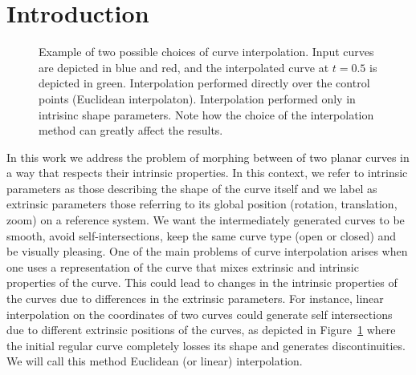 \documentclass{ipol}
\newcommand{\chapFiveDir}{images/chapter_05a}
\begin{document}
\section{Introduction}
%
\begin{figure}[h]
	\centering
	\caption{Example of two possible choices of curve interpolation. Input curves are depicted in blue and red, and the interpolated curve at $t=0.5$ is depicted in green. \protect{} Interpolation performed directly over the control points (Euclidean interpolaton). \protect{} Interpolation performed only in intrisinc shape parameters. Note how the choice of the interpolation method can greatly affect the results.}
	\label{fig:image_interpolation:curve_interpolation:example}
\end{figure}
%
In this work we address the problem of morphing between of two planar curves in a way that respects their intrinsic properties. In this context, we refer to intrinsic parameters as those describing the shape of the curve itself and we label as extrinsic parameters those referring to its global position (rotation, translation, zoom) on a reference system. We want the intermediately generated curves to be smooth, avoid self-intersections, keep the same curve type (open or closed) and be visually pleasing. 
%
One of the main problems of curve interpolation arises when one uses a representation of the curve that mixes extrinsic and intrinsic properties of the curve. This could lead to changes in the intrinsic properties of the curves due to differences in the extrinsic parameters. For instance, linear interpolation on the coordinates of two curves could generate self intersections due to different extrinsic positions of the curves, as depicted in \mbox{Figure \ref{fig:image_interpolation:curve_interpolation:example}} where the initial regular curve completely losses its shape and generates discontinuities. We will call this method Euclidean (or linear) interpolation.\\
\end{document}
